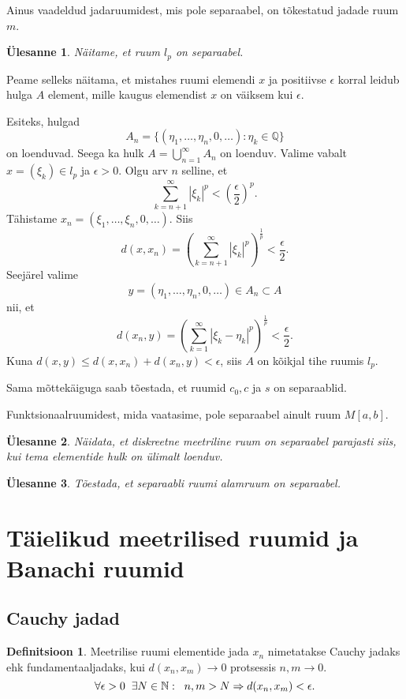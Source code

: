 \documentclass{article}[12pt]
\newcommand{\h}{\hspace{0.2cm}}
\newcommand{\N}{\mathbb{N}}
\newcommand{\Q}{\mathbb{Q}}
\newtheorem{yl}{Ülesanne}[section]
\theoremstyle{definition}
\newtheorem{definition}{Definitsioon}[section]
\theoremstyle{definition}
\theoremstyle{definition}
\theoremstyle{break}
\begin{document}
Ainus vaadeldud jadaruumidest, mis pole separaabel, on tõkestatud jadade ruum $m$.

\begin{yl}
	Näitame, et ruum $l_p$ on separaabel.
\end{yl}

Peame selleks näitama, et mistahes ruumi elemendi $x$ ja positiivse $\epsilon$ korral leidub hulga $A$ element, mille kaugus elemendist $x$ on väiksem kui $\epsilon$.
	
Esiteks, hulgad 
\[
	A_n = \{ (\eta_1,\dots, \eta_n,0,\dots):\eta_k\in\Q \}
\]
on loenduvad.
Seega ka hulk $A=\bigcup_{n=1}^\infty A_n$ on loenduv.
Valime vabalt $x=(\xi_k)\in l_p$ ja $\epsilon > 0$.
Olgu arv $n$ selline, et
\[
	\sum_{k=n+1}^\infty | \xi_k|^p < \left(\frac{\epsilon}{2}\right)^p.
\]
Tähistame $x_n = (\xi_1,\dots,\xi_n,0,\dots)$. 
Siis
\[
	d(x,x_n) = \left(\sum_{k=n+1}^\infty | \xi_k|^p\right)^\frac{1}{p} < \frac{\epsilon}{2}.
\]
Seejärel valime
\[
	y = (\eta_1,\dots,\eta_n,0,\dots)\in A_n\subset A
\]
nii, et
\[
	d(x_n,y) = \left(\sum_{k=1}^\infty | \xi_k-\eta_k |^p\right)^\frac{1}{p} < \frac{\epsilon}{2}.
\]
Kuna $d(x,y) \leq d(x,x_n) + d(x_n, y) < \epsilon$, siis $A$ on kõikjal tihe ruumis $l_p$.

Sama mõttekäiguga saab tõestada, et ruumid $c_0, c$ ja $s$ on separaablid.

Funktsionaalruumidest, mida vaatasime, pole separaabel ainult ruum $M[a,b]$.

\begin{yl}
	Näidata, et diskreetne meetriline ruum on separaabel parajasti siis, kui tema elementide hulk on ülimalt loenduv.
\end{yl}

\begin{yl}
	Tõestada, et separaabli ruumi alamruum on separaabel.
\end{yl}

\section{Täielikud meetrilised ruumid ja Banachi ruumid}

\subsection{Cauchy jadad}

\begin{definition}
	Meetrilise ruumi elementide jada $x_n$ nimetatakse Cauchy jadaks ehk fundamentaaljadaks, kui $d(x_n,x_m)\rightarrow 0$ protsessis $n,m\rightarrow 0$.
	\[
		\forall \epsilon > 0\h\exists N\in\N: \h n,m>N\Rightarrow d(x_n,x_m) < \epsilon.
	\]
\end{definition}
\end{document}
